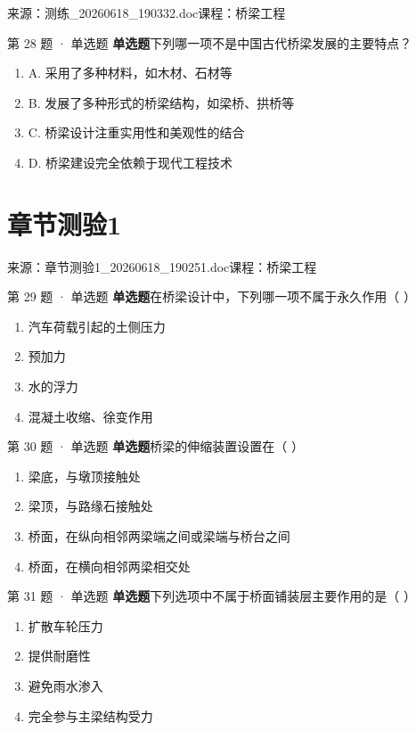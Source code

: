\documentclass[UTF8,zihao=-4,openany]{ctexbook}
\newenvironment{choices}{\begin{enumerate}[label=\Alph*.,leftmargin=9mm,labelsep=3mm,itemsep=2pt,topsep=4pt]}{\end{enumerate}}
\newcommand{\qtype}[1]{\textcolor{brand}{\sffamily\bfseries #1}}
\newcommand{\sourcefile}[1]{\textcolor{muted}{\small\sffamily 来源：#1}}
\begin{document}
\sourcefile{测练\_20260618\_190332.doc}\quad \textcolor{muted}{\small\sffamily 课程：桥梁工程}

\begin{questionbox}{第 28 题 · 单选题}
\qtype{单选题}\quad 下列哪一项不是中国古代桥梁发展的主要特点？
\begin{choices}
\item A. 采用了多种材料，如木材、石材等
\item B. 发展了多种形式的桥梁结构，如梁桥、拱桥等
\item C. 桥梁设计注重实用性和美观性的结合
\item D. 桥梁建设完全依赖于现代工程技术
\end{choices}
\end{questionbox}

\chapter{章节测验1}

\sourcefile{章节测验1\_20260618\_190251.doc}\quad \textcolor{muted}{\small\sffamily 课程：桥梁工程}

\begin{questionbox}{第 29 题 · 单选题}
\qtype{单选题}\quad 在桥梁设计中，下列哪一项不属于永久作用（ ）
\begin{choices}
\item 汽车荷载引起的土侧压力
\item 预加力
\item 水的浮力
\item 混凝土收缩、徐变作用
\end{choices}
\end{questionbox}

\begin{questionbox}{第 30 题 · 单选题}
\qtype{单选题}\quad 桥梁的伸缩装置设置在（ ）
\begin{choices}
\item 梁底，与墩顶接触处
\item 梁顶，与路缘石接触处
\item 桥面，在纵向相邻两梁端之间或梁端与桥台之间
\item 桥面，在横向相邻两梁相交处
\end{choices}
\end{questionbox}

\begin{questionbox}{第 31 题 · 单选题}
\qtype{单选题}\quad 下列选项中不属于桥面铺装层主要作用的是（ ）
\begin{choices}
\item 扩散车轮压力
\item 提供耐磨性
\item 避免雨水渗入
\item 完全参与主梁结构受力
\end{choices}
\end{questionbox}
\end{document}

